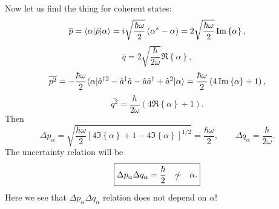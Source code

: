 Now let us find the thing for coherent states:
\begin{equation}
	\overline{p} = \langle\alpha\rvert \hat{p} \lvert\alpha\rangle = i \sqrt{\frac{\hbar \omega}{2}} \left( \alpha^* - \alpha \right) = 2 \sqrt{\frac{\hbar \omega}{2}} \operatorname{Im} \left\{ \alpha \right\},
\end{equation}
\begin{equation}
	\overline{q} = 2 \sqrt{\frac{\hbar }{2\omega}} \Re \left\{\alpha \right\},
\end{equation}
\begin{equation}
	\overline{p^2} = - \frac{\hbar \omega}{2} \langle\alpha\rvert \hat{a}^{\dagger 2} - \hat{a}^{\dagger} \hat{a} - \hat{a} \hat{a}^{\dagger} + \hat{a}^2  \lvert\alpha\rangle = \frac{\hbar \omega}{2} \left( 4 \operatorname{Im} \left\{ \alpha \right\} + 1\right),
\end{equation}
\begin{equation}
	\overline{q^2} = \frac{\hbar}{2 \omega} \left( 4 \Re \left\{ \alpha \right\} + 1\right).
\end{equation}
Then
\begin{equation}
	\Delta p_{\alpha} = \sqrt{\frac{\hbar \omega}{2} \left[ 4 \Im \left\{ \alpha \right\} + 1 - 4 \Im \left\{ \alpha \right\} \right]^{1/2}} = \frac{\hbar \omega}{2}, \qquad \Delta q_{\alpha} = \frac{\hbar}{2 \omega}.
\end{equation}
The uncertainty relation will be
\begin{equation}
	\boxed{\Delta p_{\alpha} \Delta q_{\alpha} = \frac{\hbar}{2} \quad \slashed{\sim} \quad  \alpha.}
\end{equation}
Here we see that $\Delta p_{\alpha} \Delta q_{\alpha}$ relation does not depend on $\alpha$!
